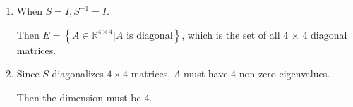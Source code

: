 \documentclass[12pt,letterpaper]{article}
\begin{document}
\begin{enumerate}
\begin{enumerate}
\begin{proof}
            \begin{itemize}
              \item
                Choose $A = 0$.

                Then $S^{-1}0S = 0$, and since 0 is diagonal, $0 \in E$.
              \item
                Choose $c, d \in \mathbb{R}$, and $A, B \in \mathbb{R}$.

                Then $S^{-1}\left(cA + dB\right)S = \left(S^{-1}(cA) + S^{-1}(dB)\right)S = S^{-1}(cA)S + S^{-1}(dB)S = c\left(S^{-1}AS\right) + d\left(S^{-1}BS\right)$.

                Now, since $A, B$ are diagonal, and $S^{-1}AS, S^{-1}BS$ are diagonal,
                we know $c\left(S^{-1}AS\right), d\left(S^{-1}BS\right)$ are also diagonal,
                so their sum is diagonal as well.

                So $cA + dB \in E$.

                Note that we chose arbitrary $c, d \in \mathbb{R}$, and $A, B \in E$ so this holds for all cases,

                In particular the case where $d = 0, B = 0$,
                which gives a proof of closure under scalar multiplication.

                And also the case where $c = d = 1$,
                which gives a proof of closure under vector addition.
            \end{itemize}
          \end{proof}
        \item
          When $S = I, S^{-1} = I$.

          Then $E = \left\{A \in \mathbb{R}^{4 \times 4} | A \text{ is diagonal} \right\}$,
          which is the set of all 4 $\times$ 4 diagonal matrices.
        \item
          Since $S$ diagonalizes $4 \times 4$ matrices, $\Lambda$ must have 4 non-zero eigenvalues.

          Then the dimension must be 4.
      \end{enumerate}
  \end{enumerate}
\end{document}
